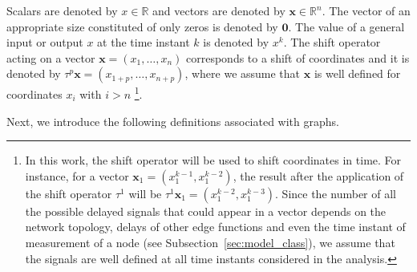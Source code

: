 \documentclass[letterpaper,10pt,journal]{IEEEtran}
\newcommand{\x}{\mathbf{x}}
\newcommand{\R}{\mathbb R}
\begin{document}
Scalars are denoted by $x\in\R$ and vectors are denoted by $\mathbf{x}\in\R^n$. The vector of an appropriate size constituted of only zeros is denoted by $\mathbf{0}$. 
The value of a general input or output $x$ at the time instant $k$ is denoted by $x^k$. The shift operator acting on a vector $\x=(x_1,\ldots,x_n)$ corresponds to a shift of coordinates and it is denoted by $\tau^p\x=(x_{1+p},\ldots,x_{n+p})$, where we assume that $\x$ is well defined for coordinates $x_i$ with $i>n$ \footnote{In this work, the shift operator will be used to shift coordinates in time.  For instance, for a  vector $\x_1=(x_1^{k-1},x_1^{k-2})$, the result after the application of the shift operator $\tau^1$ will be $\tau^1\x_1=(x_1^{k-2},x_1^{k-3})$. Since the number of all the possible delayed signals that could appear in a vector depends on the network topology, delays of other edge functions and even the time instant of measurement of a node (see Subsection~\ref{sec:model_class}), we assume that the signals are well defined at all time instants considered in the analysis.}.

Next, we introduce the following definitions associated with graphs.
\end{document}
